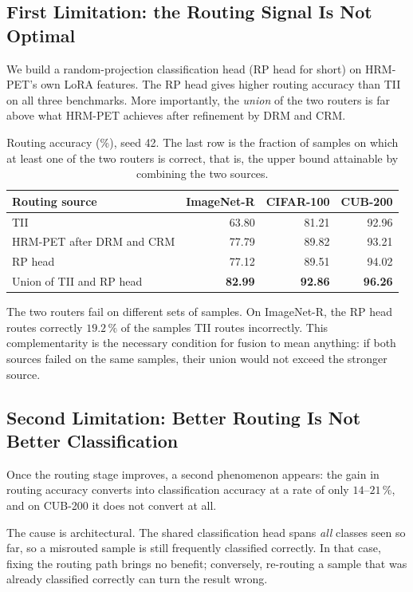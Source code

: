 \documentclass[11pt,a4paper]{article}
\begin{document}
\subsection{First Limitation: the Routing Signal Is Not Optimal}

We build a random-projection classification head (RP head for short) on
HRM-PET's own LoRA features. The RP head gives higher routing accuracy than TII
on all three benchmarks. More importantly, the \emph{union} of the two routers
is far above what HRM-PET achieves after refinement by DRM and CRM.

\begin{table}[htbp]
\centering
\caption{Routing accuracy (\%), seed 42. The last row is the fraction of samples
on which at least one of the two routers is correct, that is, the upper bound
attainable by combining the two sources.}
\label{tab:routing}
\begin{tabular}{lrrr}
\toprule
Routing source & ImageNet-R & CIFAR-100 & CUB-200 \\
\midrule
TII                        & 63.80 & 81.21 & 92.96 \\
HRM-PET after DRM and CRM  & 77.79 & 89.82 & 93.21 \\
RP head                    & 77.12 & 89.51 & 94.02 \\
\midrule
Union of TII and RP head   & \textbf{82.99} & \textbf{92.86} & \textbf{96.26} \\
\bottomrule
\end{tabular}
\end{table}

The two routers fail on different sets of samples. On ImageNet-R, the RP head
routes correctly $19.2\,\%$ of the samples TII routes incorrectly. This
complementarity is the necessary condition for fusion to mean anything: if both
sources failed on the same samples, their union would not exceed the stronger
source.

\subsection{Second Limitation: Better Routing Is Not Better Classification}

Once the routing stage improves, a second phenomenon appears: the gain in
routing accuracy converts into classification accuracy at a rate of only
$14$--$21\,\%$, and on CUB-200 it does not convert at all.

The cause is architectural. The shared classification head spans \emph{all}
classes seen so far, so a misrouted sample is still frequently classified
correctly. In that case, fixing the routing path brings no benefit; conversely,
re-routing a sample that was already classified correctly can turn the result
wrong.
\end{document}
